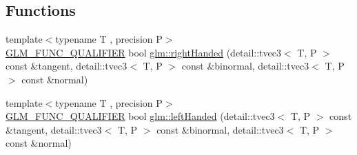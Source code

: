 \subsection*{Functions}
\begin{DoxyCompactItemize}
\item 
{\footnotesize template$<$typename T , precision P$>$ }\\\hyperlink{setup_8hpp_a33fdea6f91c5f834105f7415e2a64407}{G\+L\+M\+\_\+\+F\+U\+N\+C\+\_\+\+Q\+U\+A\+L\+I\+F\+I\+ER} bool \hyperlink{group__gtx__handed__coordinate__space_ga16517e8a56cba5ba908e6eac6500ab94}{glm\+::right\+Handed} (detail\+::tvec3$<$ T, P $>$ const \&tangent, detail\+::tvec3$<$ T, P $>$ const \&binormal, detail\+::tvec3$<$ T, P $>$ const \&normal)
\item 
{\footnotesize template$<$typename T , precision P$>$ }\\\hyperlink{setup_8hpp_a33fdea6f91c5f834105f7415e2a64407}{G\+L\+M\+\_\+\+F\+U\+N\+C\+\_\+\+Q\+U\+A\+L\+I\+F\+I\+ER} bool \hyperlink{group__gtx__handed__coordinate__space_ga2c0882af0eabd0e39da5680931f586ed}{glm\+::left\+Handed} (detail\+::tvec3$<$ T, P $>$ const \&tangent, detail\+::tvec3$<$ T, P $>$ const \&binormal, detail\+::tvec3$<$ T, P $>$ const \&normal)
\end{DoxyCompactItemize}

